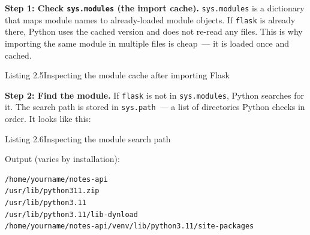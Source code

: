 \textbf{Step 1: Check \texttt{sys.modules} (the import cache).} \texttt{sys.modules} is a dictionary that maps module names to already-loaded module objects. If \texttt{flask} is already there, Python uses the cached version and does not re-read any files. This is why importing the same module in multiple files is cheap~--- it is loaded once and cached.

\begin{codeboxcap}[short]{\textcolor{accent}{Listing 2.5}\enspace Inspecting the module cache after importing Flask}

\begin{Shaded}
\begin{Highlighting}[]

\NormalTok{(} 
\NormalTok{(}\NormalTok{(sys.modules[}\NormalTok{]))   }
\end{Highlighting}
\end{Shaded}

\end{codeboxcap}

\noindent{}\textbf{Step 2: Find the module.} If \texttt{flask} is not in \texttt{sys.modules}, Python searches for it. The search path is stored in \texttt{sys.path}~--- a list of directories Python checks in order. It looks like this:

\begin{codeboxcap}[short]{\textcolor{accent}{Listing 2.6}\enspace Inspecting the module search path}

\begin{Shaded}
\begin{Highlighting}[]
\end{Highlighting}
\end{Shaded}

\end{codeboxcap}

\noindent{}Output (varies by installation):

\begin{outputbox}[short]
\begin{Verbatim}[fontsize=\codesize, breaklines, breakanywhere, breaksymbolleft={\tiny\textcolor{muted}{$\hookrightarrow$}}]
/home/yourname/notes-api
/usr/lib/python311.zip
/usr/lib/python3.11
/usr/lib/python3.11/lib-dynload
/home/yourname/notes-api/venv/lib/python3.11/site-packages
\end{Verbatim}
\end{outputbox}

